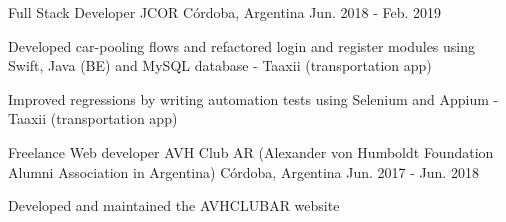 \documentclass[10pt, a4paper]{resume}
\begin{document}
\begin{cventries}
    \cventry
    {Full Stack Developer}
    {JCOR}
    {Córdoba, Argentina}
    {Jun. 2018 - Feb. 2019}
    {
        \begin{cvitems}
        \item{Developed car-pooling flows and refactored login and register modules using Swift, Java (BE) and MySQL database - Taaxii (transportation app)}
        \item{Improved regressions by writing automation tests using Selenium and Appium - Taaxii (transportation app)}
        \end{cvitems}
    }

    \cventry
    {Freelance Web developer}
    {AVH Club AR (Alexander von Humboldt Foundation Alumni Association in Argentina)}
    {Córdoba, Argentina}
    {Jun. 2017 - Jun. 2018}
    {
        \begin{cvitems}
        \item {Developed and maintained the AVHCLUBAR website\newline
             }
        \end{cvitems}
    }

\end{cventries}


\end{document}
